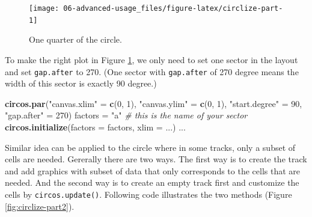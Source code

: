 \documentclass[]{book}
\newenvironment{Shaded}{\begin{snugshade}}{\end{snugshade}}
\newcommand{\KeywordTok}[1]{\textcolor[rgb]{0.13,0.29,0.53}{\textbf{#1}}}
\newcommand{\DataTypeTok}[1]{\textcolor[rgb]{0.13,0.29,0.53}{#1}}
\newcommand{\DecValTok}[1]{\textcolor[rgb]{0.00,0.00,0.81}{#1}}
\newcommand{\StringTok}[1]{\textcolor[rgb]{0.31,0.60,0.02}{#1}}
\newcommand{\CommentTok}[1]{\textcolor[rgb]{0.56,0.35,0.01}{\textit{#1}}}
\newcommand{\NormalTok}[1]{#1}
\theoremstyle{definition}
\theoremstyle{definition}
\theoremstyle{remark}
\begin{document}
\begin{figure}

{\centering \texttt{[image: 06-advanced-usage\_files/figure-latex/circlize-part-1]} 

}

\caption{One quarter of the circle.}\label{fig:circlize-part}
\end{figure}

To make the right plot in Figure \ref{fig:circlize-part}, we only need
to set one sector in the layout and set \texttt{gap.after} to 270. (One
sector with \texttt{gap.after} of 270 degree means the width of this
sector is exactly 90 degree.)

\begin{Shaded}
\begin{Highlighting}[]
\KeywordTok{circos.par}\NormalTok{(}\StringTok{"canvas.xlim"}\NormalTok{ =}\StringTok{ }\KeywordTok{c}\NormalTok{(}\DecValTok{0}\NormalTok{, }\DecValTok{1}\NormalTok{), }\StringTok{"canvas.ylim"}\NormalTok{ =}\StringTok{ }\KeywordTok{c}\NormalTok{(}\DecValTok{0}\NormalTok{, }\DecValTok{1}\NormalTok{),}
    \StringTok{"start.degree"}\NormalTok{ =}\StringTok{ }\DecValTok{90}\NormalTok{, }\StringTok{"gap.after"}\NormalTok{ =}\StringTok{ }\DecValTok{270}\NormalTok{)}
\NormalTok{factors =}\StringTok{ "a"} \CommentTok{# this is the name of your sector}
\KeywordTok{circos.initialize}\NormalTok{(}\DataTypeTok{factors =}\NormalTok{ factors, }\DataTypeTok{xlim =}\NormalTok{ ...)}
\NormalTok{...}
\end{Highlighting}
\end{Shaded}

Similar idea can be applied to the circle where in some tracks, only a
subset of cells are needed. Gererally there are two ways. The first way
is to create the track and add graphics with subset of data that only
corresponds to the cells that are needed. And the second way is to
create an empty track first and customize the cells by
\texttt{circos.update()}. Following code illustrates the two methods
(Figure \ref{fig:circlize-part2}).
\end{document}
